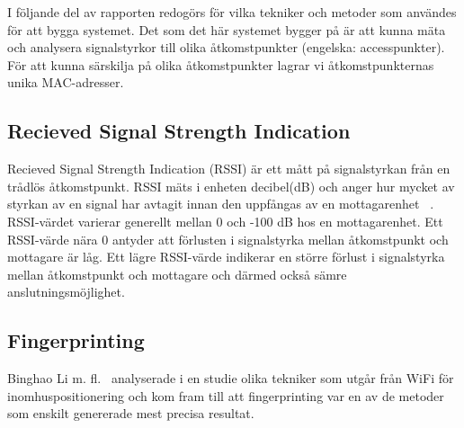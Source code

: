 \documentclass[a4paper,12pt]{article}
\begin{document}

 I följande del av rapporten redogörs för vilka tekniker och metoder som användes för att bygga systemet. Det som det här systemet bygger på är att kunna mäta och analysera signalstyrkor till olika åtkomstpunkter (engelska: accesspunkter). För att kunna särskilja på olika åtkomstpunkter lagrar vi åtkomstpunkternas unika MAC-adresser.

 \subsection{Recieved Signal Strength Indication}\label{RSSI}
 Recieved Signal Strength Indication (RSSI) är ett mått på signalstyrkan från en trådlös åtkomstpunkt. RSSI mäts i enheten decibel(dB) och anger hur mycket av styrkan av en signal har avtagit innan den uppfångas av en mottagarenhet ~\cite{RSSI_expl}. RSSI-värdet varierar generellt mellan 0 och -100 dB hos en mottagarenhet. Ett RSSI-värde nära 0 antyder att förlusten i signalstyrka mellan åtkomstpunkt och mottagare är låg. Ett lägre RSSI-värde indikerar en större förlust i signalstyrka mellan åtkomstpunkt och mottagare och därmed också sämre anslutningsmöjlighet.

 \subsection{Fingerprinting}\label{fingerprinting}

 Binghao Li m. fl.~\cite{IP1} analyserade i en studie  olika tekniker som utgår från WiFi för inomhuspositionering och kom fram till att fingerprinting var en av de metoder som enskilt genererade mest precisa resultat.
\end{document}
